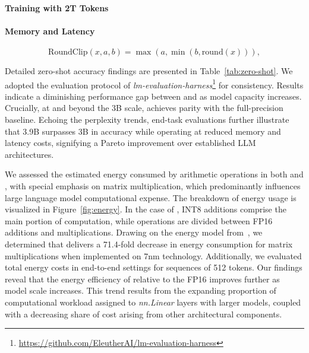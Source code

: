 \paragraph{Training with 2T Tokens}

\paragraph{Memory and Latency}

\begin{equation}
    \mathrm{RoundClip}(x, a, b) = \max(a, \min(b, \mathrm{round}(x))),
\end{equation}

Detailed zero-shot accuracy findings are presented in Table~\ref{tab:zero-shot}. We adopted the evaluation protocol of \emph{lm-evaluation-harness}\footnote{\url{https://github.com/EleutherAI/lm-evaluation-harness}} for consistency. Results indicate a diminishing performance gap between  and  as model capacity increases. Crucially, at and beyond the 3B scale,  achieves parity with the full-precision baseline. Echoing the perplexity trends, end-task evaluations further illustrate that  3.9B surpasses  3B in accuracy while operating at reduced memory and latency costs, signifying a Pareto improvement over established LLM architectures.

We assessed the estimated energy consumed by arithmetic operations in both  and , with special emphasis on matrix multiplication, which predominantly influences large language model computational expense. The breakdown of energy usage is visualized in Figure~\ref{fig:energy}. In the case of , INT8 additions comprise the main portion of computation, while  operations are divided between FP16 additions and multiplications. Drawing on the energy model from~\cite{energycost, pokebnn}, we determined that  delivers a 71.4-fold decrease in energy consumption for matrix multiplications when implemented on 7nm technology. Additionally, we evaluated total energy costs in end-to-end settings for sequences of 512 tokens. Our findings reveal that the energy efficiency of  relative to the FP16  improves further as model scale increases. This trend results from the expanding proportion of computational workload assigned to \emph{nn.Linear} layers with larger models, coupled with a decreasing share of cost arising from other architectural components.



